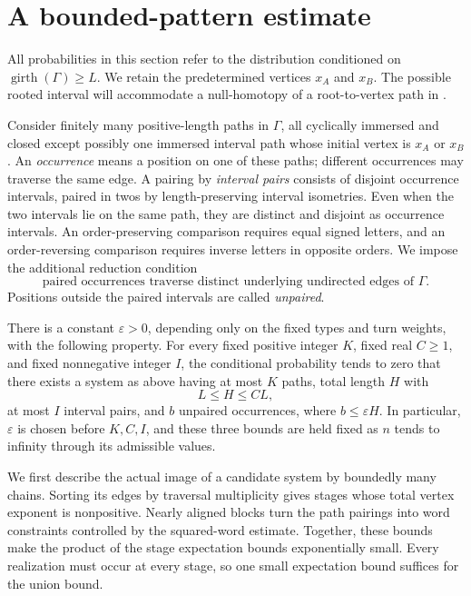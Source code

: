\section{A bounded-pattern estimate}
\label{sec:bounded-pattern}

All probabilities in this section refer to the distribution conditioned on
\(\operatorname{girth}(\Gamma)\ge L\).  We retain the predetermined vertices
\(x_A\) and \(x_B\). The possible rooted interval will accommodate a
null-homotopy of a root-to-vertex path in .

Consider finitely many positive-length paths in \(\Gamma\), all cyclically
immersed and closed except possibly one immersed interval path whose
initial vertex is \(x_A\) or \(x_B\).  An \emph{occurrence} means a position
on one of these paths; different occurrences may traverse the same edge.
A pairing by \emph{interval pairs} consists of disjoint occurrence
intervals, paired in twos by length-preserving interval isometries.  Even
when the two intervals lie on the same path, they are distinct and
disjoint as occurrence intervals.  An order-preserving comparison
requires equal signed letters, and an order-reversing comparison
requires inverse letters in opposite orders.  We impose the additional
reduction condition
\begin{equation}
 \text{paired occurrences traverse distinct underlying undirected
 edges of }\Gamma.
 \label{eq:edge-reduction}
\end{equation}
Positions outside the paired intervals are called \emph{unpaired}.

\begin{samepage}
\begin{proposition}
\label{prop:bounded-pattern}
There is a constant \(\varepsilon>0\), depending only on the fixed types
and turn weights, with the following property.  For every fixed positive
integer \(K\), fixed real \(C\ge1\), and fixed nonnegative integer \(I\),
the conditional probability tends to zero that there exists a system as
above having at most \(K\) paths, total length \(H\) with
\[
 L\le H\le CL,
\]
at most \(I\) interval pairs, and \(b\) unpaired occurrences, where
\(b\le\varepsilon H\).  In particular, \(\varepsilon\) is chosen before
\(K,C,I\), and these three bounds are held fixed as \(n\) tends to
infinity through its admissible values.
\end{proposition}
\end{samepage}

We first describe the actual image of a candidate system by boundedly
many chains. Sorting its edges by traversal multiplicity gives stages
whose total vertex exponent is nonpositive. Nearly aligned blocks turn
the path pairings into word constraints controlled by the squared-word
estimate. Together, these bounds make the product of the stage expectation
bounds exponentially small. Every realization must occur at every stage,
so one small expectation bound suffices for the union bound.

